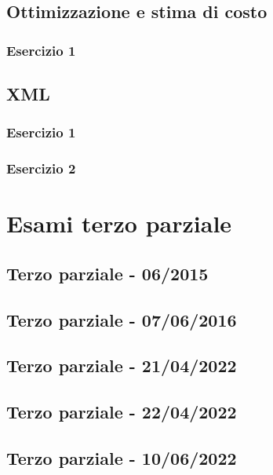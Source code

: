 \documentclass[a4paper]{article}
\begin{document}
	\subsection{Ottimizzazione e stima di costo}
	
	\subsubsection{Esercizio 1}
	
	\subsection{XML}
	
	\subsubsection{Esercizio 1}
	
	\subsubsection{Esercizio 2}
	
	\section{Esami terzo parziale}
	
	\subsection{Terzo parziale - 06/2015}
	
	\subsection{Terzo parziale - 07/06/2016}
	
	\subsection{Terzo parziale - 21/04/2022}
	
	\subsection{Terzo parziale - 22/04/2022}
	
	\subsection{Terzo parziale - 10/06/2022}
\end{document}
